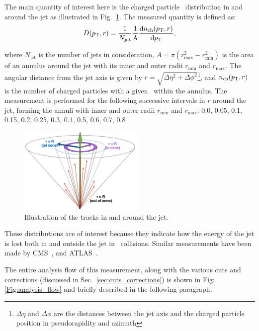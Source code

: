 
The main quantity of interest here is the charged particle \pt\ distribution in and around the jet as illustrated in Fig.~\ref{Fig:dpt_def}.
The measured quantity is defined as:
  \begin{equation}
  \mbox{$D( \mbox{$p_{\mathrm{T}}$}, r)$} = \frac{1}{N_{\mathrm{jet}}} \frac{1}{\mathrm{A}} \frac{\mathrm{d} n_{\mathrm{ch}} (\mbox{$p_{\mathrm{T}}$}, r)}{\mathrm{d} \mbox{$p_{\mathrm{T}}$}},
\end{equation}

where $N_{\mathrm{jet}}$ is the number of jets in consideration, $A = \pi (r_{\mathrm{max}}^2 - r_{\mathrm{min}}^2) $ is the area of an annulus around the jet with its inner and outer radii $r_{\mathrm{min}}$ and $r_{\mathrm{max}}$.
The angular distance from the jet axis is given by $r = \sqrt{\Delta \eta^2 + \Delta \phi^2}$\footnote{$\Delta \eta$ and $\Delta \phi$ are the distances between the jet axis and the charged particle position in pseudorapidity and azimuth}, and $n_{\mathrm{ch}}(\mbox{$p_{\mathrm{T}}$}, r)$ is the number of charged particles with a given \pt\ within the annulus.
The measurement is performed for the following successive intervals in $r$ around the jet, forming the annuli with inner and outer radii $r_{\textrm{min}}$ and $r_{\textrm{max}}$: 0.0, 0.05, 0.1, 0.15, 0.2, 0.25, 0.3, 0.4, 0.5, 0.6, 0.7, 0.8


\begin{figure}
\centerline{
\includegraphics[width=0.55\textwidth]{figures/main/general/fragScheme_Shape.pdf} }
\caption{Illustration of the tracks in and around the jet.
}
\label{Fig:dpt_def}
\end{figure}

These distributions are of interest because they indicate how the energy of the jet is lost both in and outside the jet in \pbpb\ collisions.
Similar measurements have been made by CMS~\cite{CMSPASHIN16020, Chatrchyan:2014ava}, and ATLAS~\cite{PhysRevC.98.024908, Aaboud:2017bzv}.

The entire analysis flow of this measurement, along with the various cuts and corrections (discussed in Sec.~\ref{sec:cuts_corrections}) is shown in Fig:\ref{Fig:analysis_flow} and briefly described in the following paragraph.

